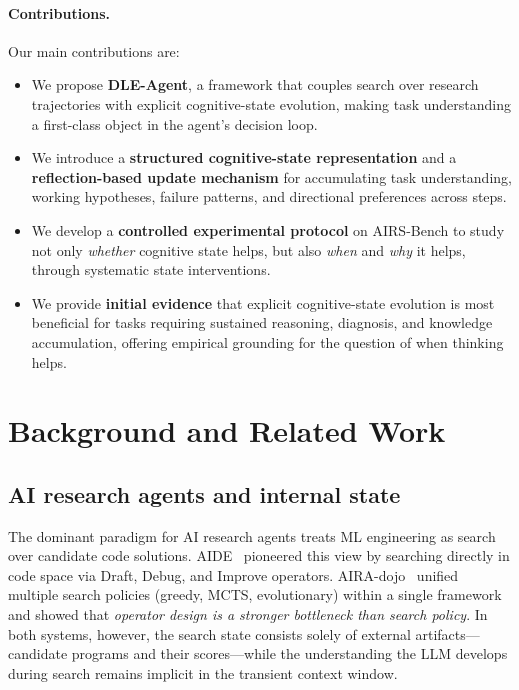 \documentclass{article} %
\begin{document}
\paragraph{Contributions.} Our main contributions are:
\begin{itemize}
  \item We propose \textbf{DLE-Agent}, a framework that couples search over
  research trajectories with explicit cognitive-state evolution, making task
  understanding a first-class object in the agent's decision loop.
  \item We introduce a \textbf{structured cognitive-state representation} and
  a \textbf{reflection-based update mechanism} for accumulating task
  understanding, working hypotheses, failure patterns, and directional
  preferences across steps.
  \item We develop a \textbf{controlled experimental protocol} on AIRS-Bench
  to study not only \emph{whether} cognitive state helps, but also
  \emph{when} and \emph{why} it helps, through systematic state
  interventions.
  \item We provide \textbf{initial evidence} that explicit cognitive-state
  evolution is most beneficial for tasks requiring sustained reasoning,
  diagnosis, and knowledge accumulation, offering empirical grounding for
  the question of when thinking helps.
\end{itemize}

\section{Background and Related Work}
\label{sec:related}

\subsection{AI research agents and internal state}
\label{sec:rw-agents}

The dominant paradigm for AI research agents treats ML engineering as search
over candidate code solutions. AIDE~\citep{jiang2025aide} pioneered this view
by searching directly in code space via Draft, Debug, and Improve operators.
AIRA-dojo~\citep{airadojo2025} unified multiple search policies (greedy,
MCTS, evolutionary) within a single framework and showed that \emph{operator
design is a stronger bottleneck than search policy}. In both systems, however,
the search state consists solely of external artifacts---candidate programs
and their scores---while the understanding the LLM develops during search
remains implicit in the transient context window.
\end{document}
